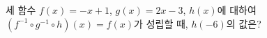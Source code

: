 세 함수 $f(x)=-x+1$, $g(x)=2x-3$, $h(x)$에 대하여 $(f^{-1}\circ g^{-1}\circ h)(x)=f(x)$가 성립할 때, $h(-6)$의 값은?
